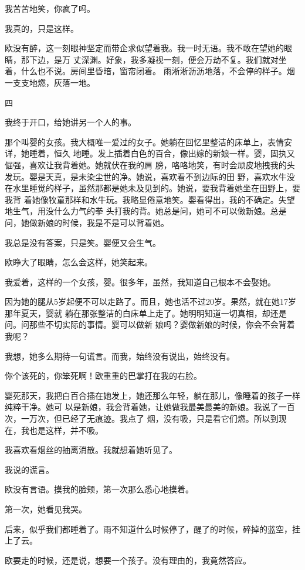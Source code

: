 \documentclass[12pt,a4paper]{article}
\newcommand{\subpart}[1]{
	\begingroup \par
	\vspace{1ex} \centering #1
	\par \endgroup
}
\begin{document}
		我苦苦地笑，你疯了吗。\par
		我真的，只是这样。

		欧没有醉，这一刻眼神坚定而带企求似望着我。我一时无语。我不敢在望她的眼睛，那下边，是万
	丈深渊。好象，我多凝视一刻，便会万劫不复。我们就对坐着，什么也不说。房间里昏暗，窗帘闭着。
	雨淅淅沥沥地落，不会停的样子。烟一支支地燃，灰落一地。

		\subpart{四}

		我终于开口，给她讲另一个人的事。

		那个叫婴的女孩。我大概唯一爱过的女子。她躺在回忆里整洁的床单上，表情安详，她睡着，恒久
	地睡。发上插着白色的百合，像出嫁的新娘一样。婴，固执又倔强，喜欢让我背着她。她就伏在我的肩
	膀，咯咯地笑，有时会顽皮地拽我的头发玩。婴是天真，是未染尘世的净。她说，喜欢看不到边际的田
	野，喜欢水牛没在水里睡觉的样子，虽然那都是她未及见到的。她说，要我背着她坐在田野上，要我背
	着她像牧童那样和水牛玩。我略显倦意地笑。婴看得出，我的不确定。失望地生气，用没什么力气的拳
	头打我的背。她总是问，她可不可以做新娘。总是问，她做新娘的时候，我是不是可以背着她。

		我总是没有答案，只是笑。婴便又会生气。\par
		欧睁大了眼睛，怎么会这样，她笑起来。\par
		我爱着，这样的一个女孩，婴。很多年，虽然，我知道自己根本不会娶她。

		因为她的腿从5岁起便不可以走路了。而且，她也活不过20岁。果然，就在她17岁那年夏天，婴就
	躺在那张整洁的白床单上走了。她明明知道一切真相，却还是问。问那些不切实际的事情。婴可以做新
	娘吗？婴做新娘的时候，你会不会背着我呢？

		我想，她多么期待一句谎言。而我，始终没有说出，始终没有。\par
		你个该死的，你笨死啊！欧重重的巴掌打在我的右脸。

		婴死那天，我把白百合插在她发上，她还那么年轻，躺在那儿，像睡着的孩子一样纯粹干净。她可
	以是新娘，我会背着她，让她做我最美最美的新娘。我说了一百次，一万次，但已经了无痕迹。我点了
	烟，没有吸，只是看它们燃。所以到现在，我也是这样，并不吸。

		我喜欢看烟丝的抽离消散。我就想着她听见了。\par
		我说的谎言。\par
		欧没有言语。摸我的脸颊，第一次那么悉心地摸着。\par
		第一次，她看见我哭。\par
		后来，似乎我们都睡着了。雨不知道什么时候停了，醒了的时候，碎掉的蓝空，挂上了云。\par
		欧要走的时候，还是说，想要一个孩子。没有理由的，我竟然答应。
\end{document}
